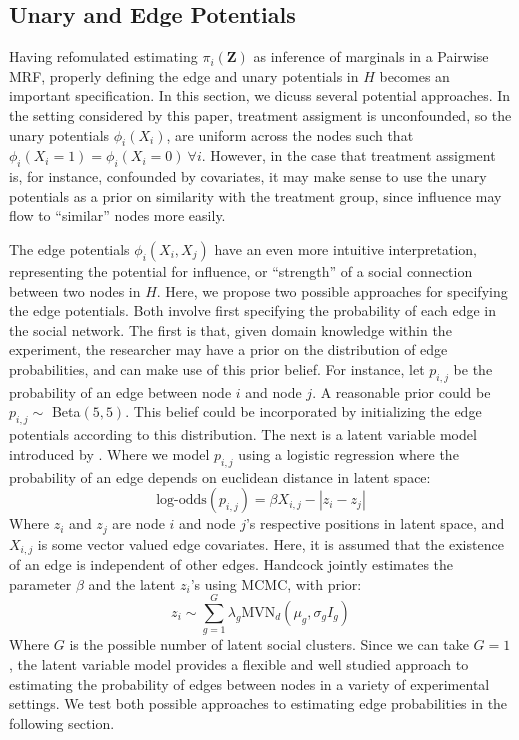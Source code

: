 \documentclass{article}
\begin{document}


\subsection{Unary and Edge Potentials}

Having refomulated estimating $\pi_i(\mathbf{Z})$ as inference of marginals in a Pairwise MRF, 
properly defining the edge and unary potentials in $H$ becomes an important specification. In this section, 
we dicuss several potential approaches. In the setting considered by this paper, treatment assigment is unconfounded, so 
the unary potentials $\phi_i(X_i)$, are uniform across the nodes such that $\phi_i(X_i = 1) = \phi_i(X_i = 0) \ \forall i$. However, 
in the case that treatment assigment is, for instance, confounded by covariates, it may make sense to use the unary potentials as a prior on similarity 
with the treatment group, since influence may flow to ``similar'' nodes more easily. 

The edge potentials $\phi_i(X_i, X_j)$ have an even more intuitive interpretation, representing the potential for influence, or ``strength'' of a social connection between two nodes in $H$. Here, 
we propose two possible approaches for specifying the edge potentials. Both involve first specifying the probability of each edge in the social network. The first is that, given domain knowledge within the experiment, the researcher may have a prior on the distribution of 
edge probabilities, and can make use of this prior belief. For instance, let $p_{i,j}$ be the probability of an edge between node 
$i$ and node $j$. A reasonable prior could be $p_{i,j} \sim $ Beta$(5, 5)$. This belief could be incorporated by initializing the 
edge potentials according to this distribution. The next is a latent variable model introduced by \cite{Handcock}. Where we model $p_{i,j}$ using a logistic regression where the probability of an edge depends on euclidean distance in latent space: 
\begin{equation}
  \mbox{log-odds}(p_{i,j}) = \beta X_{i,j} - |z_i - z_j|
\end{equation}
Where $z_i$ and $z_j$ are node $i$ and node $j$'s respective positions in latent space, and $X_{i,j}$ is some vector valued edge covariates. Here, it is assumed that the existence of an edge is independent of other edges. 
Handcock jointly estimates the parameter $\beta$ and the latent $z_i$'s using MCMC, with prior: \begin{displaymath}
  z_i \sim \sum_{g = 1}^{G}\lambda_g \mbox{MVN}_d(\mu_g, \sigma_gI_g) 
\end{displaymath}
Where $G$ is the possible number of latent social clusters. Since we can take $G = 1$, the latent variable model provides a flexible and well 
studied approach to estimating the probability of edges between nodes in a variety of experimental settings. We test both possible approaches to estimating 
edge probabilities in the following section.
\end{document}
